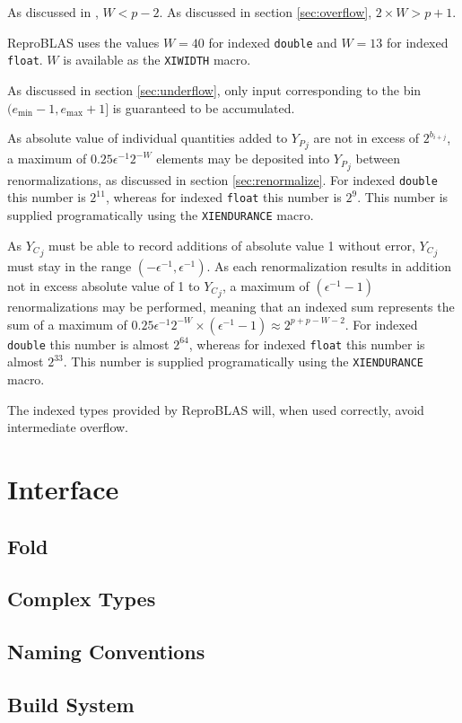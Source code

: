 \documentclass[12pt]{article}
\providecommand{\min}{\ensuremath{\text{min}}}
\providecommand{\max}{\ensuremath{\text{max}}}
\theoremstyle{plain}
\begin{document}
    As discussed in \cite{repsum}, $W < p - 2$. As discussed in section \ref{sec:overflow}, $2\times W > p + 1$.

    ReproBLAS uses the values $W = 40$ for indexed \verb|double| and $W = 13$ for indexed \verb|float|. $W$ is available as the \verb|XIWIDTH| macro.

    As discussed in section \ref{sec:underflow}, only input corresponding to the bin $(e_{\min} - 1, e_{\max} + 1]$ is guaranteed to be accumulated.

    As absolute value of individual quantities added to ${Y_P}_j$ are not in excess of $2^{b_{i + j}}$, a maximum of $0.25\epsilon^{-1}2^{-W}$ elements may be deposited into ${Y_P}_j$ between renormalizations, as discussed in section \ref{sec:renormalize}. For indexed \verb|double| this number is $2^11$, whereas for indexed \verb|float| this number is $2^9$. This number is supplied programatically using the \verb|XIENDURANCE| macro.

    As ${Y_C}_j$ must be able to record additions of absolute value 1 without error, ${Y_C}_j$ must stay in the range $(-\epsilon^{-1}, \epsilon^{-1})$. As each renormalization results in addition not in excess absolute value of 1 to ${Y_C}_j$, a maximum of $(\epsilon^{-1} - 1)$ renormalizations may be performed, meaning that an indexed sum represents the sum of a maximum of $0.25\epsilon^{-1}2^{-W} \times (\epsilon^{-1} - 1) \approx 2^{p + p - W - 2}$. For indexed \verb|double| this number is almost $2^64$, whereas for indexed \verb|float| this number is almost $2^33$. This number is supplied programatically using the \verb|XIENDURANCE| macro.

    The indexed types provided by ReproBLAS will, when used correctly, avoid intermediate overflow.

\section{Interface}
  \subsection{Fold}
  \subsection{Complex Types}
  \subsection{Naming Conventions}
  \subsection{Build System}
\end{document}
